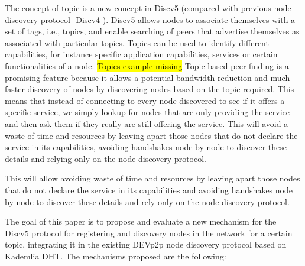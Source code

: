 The concept of topic is a new concept in Discv5 (compared with previous node discovery protocol -Discv4-).
Discv5 allows nodes to associate themselves with a set of tags, i.e., topics, and enable searching of peers that advertise themselves as associated with particular topics.  
Topics can be used to identify different  capabilities, for instance specific application capabilities,  services or certain functionalities of a node. 
\hl{Topics example missing}
Topic based peer finding is a promising feature because it allows a potential bandwidth reduction and much faster discovery of nodes
by  discovering nodes based on the topic required.
This means that instead of connecting to every node discovered to see if it offers a specific service,  we simply lookup for nodes that are only providing the service and then ask them if they really are still offering the service.
This will avoid a waste of time and resources by leaving apart those nodes that do not declare the service in its capabilities,  avoiding handshakes node by node to discover these details and relying only on the node discovery protocol. 

This will allow avoiding waste of time and resources by leaving apart those nodes that do not declare the service in its capabilities and avoiding handshakes node by node to discover these details and rely only on the node discovery protocol. 



The goal of this paper is to propose and evaluate a new mechanism for the Discv5 protocol for registering and discovery nodes in the network for a certain topic,  integrating it in the existing DEVp2p node discovery protocol based on Kademlia DHT.  
The mechanisms proposed are the following:

